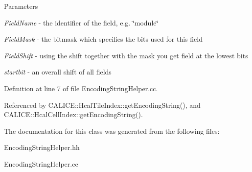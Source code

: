 \begin{DoxyParams}{Parameters}
\item[{\em FieldName}]-\/ the identifier of the field, e.g. \char`\"{}module\char`\"{} \item[{\em FieldMask}]-\/ the bitmask which specifies the bits used for this field \item[{\em FieldShift}]-\/ using the shift together with the mask you get field at the lowest bits \item[{\em startbit}]-\/ an overall shift of all fields \end{DoxyParams}


Definition at line 7 of file EncodingStringHelper.cc.

Referenced by CALICE::HcalTileIndex::getEncodingString(), and CALICE::HcalCellIndex::getEncodingString().

The documentation for this class was generated from the following files:\begin{DoxyCompactItemize}
\item 
EncodingStringHelper.hh\item 
EncodingStringHelper.cc\end{DoxyCompactItemize}
